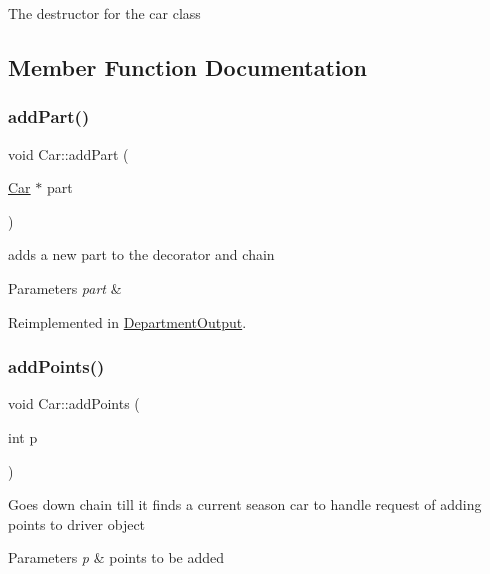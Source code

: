 The destructor for the car class 

\subsection{Member Function Documentation}
\mbox{\label{classCar_a97c6c4d86fd756e496871bda0651c5c6}} 
\subsubsection{\texorpdfstring{add\+Part()}{addPart()}}
{\footnotesize\ttfamily void Car\+::add\+Part (\begin{DoxyParamCaption}\item[{\hyperlink{classCar}{Car} $\ast$}]{part }\end{DoxyParamCaption})\hspace{0.3cm}{\ttfamily [virtual]}}

adds a new part to the decorator and chain 
\begin{DoxyParams}{Parameters}
{\em part} & \\
\hline
\end{DoxyParams}


Reimplemented in \hyperlink{classDepartmentOutput_a8b39539ad1ca3d8026d53dd5ab88be97}{Department\+Output}.

\mbox{\label{classCar_a946872fcdb7625c343e5caf90fa39617}} 
\subsubsection{\texorpdfstring{add\+Points()}{addPoints()}}
{\footnotesize\ttfamily void Car\+::add\+Points (\begin{DoxyParamCaption}\item[{int}]{p }\end{DoxyParamCaption})\hspace{0.3cm}{\ttfamily [virtual]}}

Goes down chain till it finds a current season car to handle request of adding points to driver object 
\begin{DoxyParams}{Parameters}
{\em p} & points to be added \\
\hline
\end{DoxyParams}


